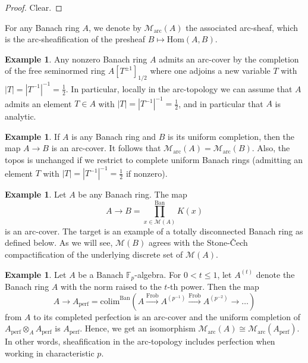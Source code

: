 \documentclass[11pt]{amsart}
\numberwithin{equation}{section}
\numberwithin{theorem}{section}
\theoremstyle{definition}
\newtheorem{example}[theorem]{Example}
\begin{document}
\begin{proof} Clear.
\end{proof}

For any Banach ring $A$, we denote by $\mathcal{M}_{\mathrm{arc}}(A)$ the associated arc-sheaf, which is the arc-sheafification of the presheaf $B\mapsto \mathrm{Hom}(A,B)$.

\begin{example} Any nonzero Banach ring $A$ admits an arc-cover by the completion of the free seminormed ring $A[T^{\pm 1}]_{1/2}$ where one adjoins a new variable $T$ with $|T|=|T^{-1}|^{-1}=\frac 12$. In particular, locally in the arc-topology we can assume that $A$ admits an element $T\in A$ with $|T|=|T^{-1}|^{-1}=\tfrac 12$, and in particular that $A$ is analytic.
\end{example}

\begin{example} If $A$ is any Banach ring and $B$ is its uniform completion, then the map $A\to B$ is an arc-cover. It follows that $\mathcal{M}_{\mathrm{arc}}(A)=\mathcal M_{\mathrm{arc}}(B)$. Also, the topos is unchanged if we restrict to complete uniform Banach rings (admitting an element $T$ with $|T|=|T^{-1}|^{-1}=\tfrac 12$ if nonzero).
\end{example}

\begin{example} Let $A$ be any Banach ring. The map
\[
A\to B=\prod_{x\in \mathcal M(A)}^{\mathrm{Ban}} K(x)
\]
is an arc-cover. The target is an example of a totally disconnected Banach ring as defined below. As we will see, $\mathcal M(B)$ agrees with the Stone-\v{C}ech compactification of the underlying discrete set of $\mathcal M(A)$.
\end{example}

\begin{example} Let $A$ be a Banach $\mathbb F_p$-algebra. For $0<t\leq 1$, let $A^{(t)}$ denote the Banach ring $A$ with the norm raised to the $t$-th power. Then the map
\[
A\to A_{\mathrm{perf}} = \mathrm{colim}^{\mathrm{Ban}}(A\xrightarrow{\mathrm{Frob}} A^{(p^{-1})}\xrightarrow{\mathrm{Frob}} A^{(p^{-2})}\to\ldots)
\]
from $A$ to its completed perfection is an arc-cover and the uniform completion of $A_{\mathrm{perf}}\otimes_A A_{\mathrm{perf}}$ is $A_{\mathrm{perf}}$. Hence, we get an isomorphism $\mathcal M_{\mathrm{arc}}(A)\cong \mathcal M_{\mathrm{arc}}(A_{\mathrm{perf}})$. In other words, sheafification in the arc-topology includes perfection when working in characteristic $p$.
\end{example}
\end{document}
